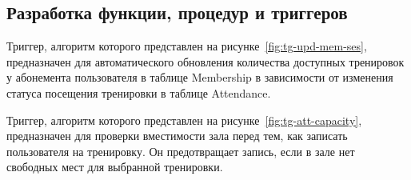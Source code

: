 \subsection{Разработка функции, процедур и триггеров}

Триггер, алгоритм которого представлен на рисунке~\ref{fig:tg-upd-mem-ses}, предназначен для автоматического обновления количества доступных тренировок у абонемента пользователя в таблице Membership в зависимости от изменения статуса посещения тренировки в таблице Attendance.

Триггер, алгоритм которого представлен на рисунке~\ref{fig:tg-att-capacity}, предназначен для проверки вместимости зала перед тем, как записать пользователя на тренировку. Он предотвращает запись, если в зале нет свободных мест для выбранной тренировки.


